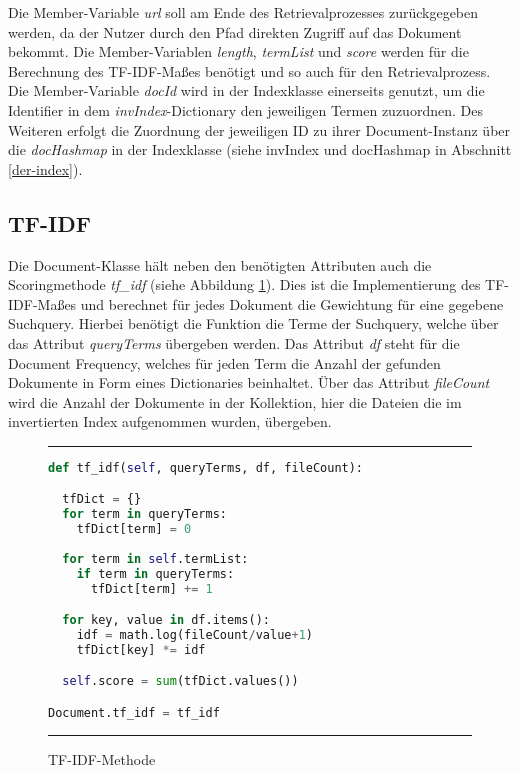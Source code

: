 Die Member-Variable \textit{url} soll am Ende des Retrievalprozesses zurückgegeben werden, da der Nutzer durch den Pfad direkten Zugriff auf das Dokument bekommt. Die Member-Variablen \textit{length}, \textit{termList} und \textit{score} werden für die Berechnung des TF-IDF-Maßes benötigt und so auch für den Retrievalprozess. Die Member-Variable \textit{docId} wird in der Indexklasse einerseits genutzt, um die Identifier in dem \textit{invIndex}-Dictionary den jeweiligen Termen zuzuordnen. Des Weiteren erfolgt die Zuordnung der jeweiligen ID zu ihrer Document-Instanz über die \textit{docHashmap} in der Indexklasse (siehe invIndex und docHashmap in Abschnitt \ref{der-index}).

\subsection{TF-IDF}\label{tf-idf}

Die Document-Klasse hält neben den benötigten Attributen auch die Scoringmethode \textit{tf\_idf} (siehe Abbildung \ref{fig:tfidf}). Dies ist die Implementierung des TF-IDF-Maßes und berechnet für jedes Dokument die Gewichtung für eine gegebene Suchquery. Hierbei benötigt die Funktion die Terme der Suchquery, welche über das Attribut \textit{queryTerms} übergeben werden. Das Attribut \textit{df} steht für die Document Frequency, welches für jeden Term die Anzahl der gefunden Dokumente in Form eines Dictionaries beinhaltet. Über das Attribut \textit{fileCount} wird die Anzahl der Dokumente in der Kollektion, hier die Dateien die im invertierten Index aufgenommen wurden, übergeben.

\begin{figure}
	\rule{\textwidth}{0.4pt}
		\begin{lstlisting}[language=Python]
def tf_idf(self, queryTerms, df, fileCount):

  tfDict = {}
  for term in queryTerms:
    tfDict[term] = 0  
  
  for term in self.termList:
    if term in queryTerms:
      tfDict[term] += 1

  for key, value in df.items():
    idf = math.log(fileCount/value+1)
    tfDict[key] *= idf

  self.score = sum(tfDict.values())

Document.tf_idf = tf_idf
		\end{lstlisting}
	\rule{\textwidth}{0.4pt}
	\caption{TF-IDF-Methode}
	\label{fig:tfidf}
\end{figure}

